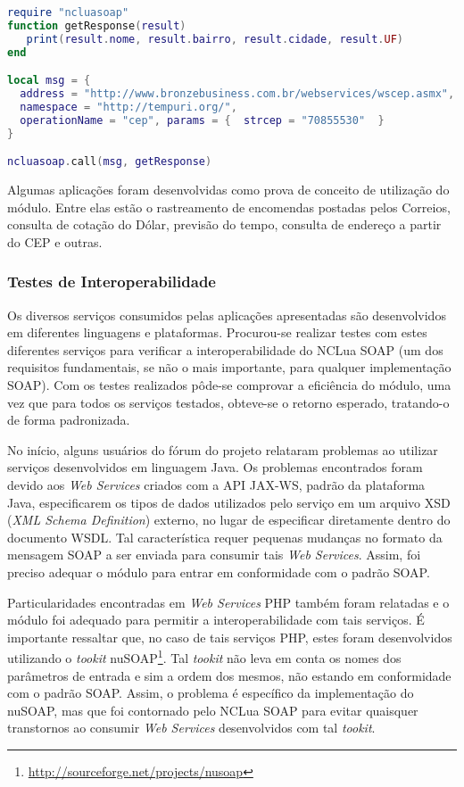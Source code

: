 \begin{lstlisting}[caption=Exemplo de consumo de WS de consulta de endereço a partir do CEP, label=list:ncluasoap2, language=lua]
require "ncluasoap"
function getResponse(result)
   print(result.nome, result.bairro, result.cidade, result.UF)
end

local msg = {
  address = "http://www.bronzebusiness.com.br/webservices/wscep.asmx",
  namespace = "http://tempuri.org/",
  operationName = "cep", params = {  strcep = "70855530"  }  
}

ncluasoap.call(msg, getResponse)
\end{lstlisting}

Algumas aplicações foram desenvolvidas como prova de conceito de utilização do módulo.
Entre elas estão o rastreamento de encomendas postadas pelos Correios,
consulta de cotação do Dólar, previsão do tempo,
consulta de endereço a partir do CEP e outras.

\subsubsection{Testes de Interoperabilidade}

Os diversos serviços consumidos pelas aplicações apresentadas 
são desenvolvidos em diferentes linguagens e plataformas. Procurou-se realizar testes
com estes diferentes serviços para verificar a interoperabilidade do NCLua SOAP 
(um dos requisitos fundamentais, se não o mais importante, para qualquer implementação
SOAP). Com os testes realizados pôde-se comprovar a eficiência do módulo, uma vez que para todos
os serviços testados, obteve-se o retorno esperado, tratando-o de forma padronizada.

No início, alguns usuários do fórum do projeto relataram problemas ao utilizar serviços
desenvolvidos em linguagem Java. Os problemas encontrados foram
devido aos \textit{Web Services} criados com a API JAX-WS, padrão da plataforma Java,
especificarem os tipos de dados utilizados pelo serviço em um arquivo XSD (\textit{XML Schema Definition}) externo,
no lugar de especificar diretamente dentro do documento WSDL. 
Tal característica requer pequenas mudanças no formato da mensagem SOAP
a ser enviada para consumir tais \textit{Web Services}. Assim, foi
preciso adequar o módulo para entrar em conformidade com o padrão SOAP.

Particularidades encontradas em \textit{Web Services} PHP também foram relatadas
e o módulo foi adequado para permitir a interoperabilidade com tais serviços.
É importante ressaltar que, no caso de tais serviços PHP, estes foram desenvolvidos
utilizando o \textit{tookit} nuSOAP\footnote{\url{http://sourceforge.net/projects/nusoap}}.
Tal \textit{tookit} não leva em conta os nomes dos parâmetros de entrada e sim a ordem
dos mesmos, não estando em conformidade com o padrão SOAP. Assim, o problema é específico da implementação
do nuSOAP, mas que foi contornado pelo NCLua SOAP para evitar quaisquer transtornos
ao consumir \textit{Web Services} desenvolvidos com tal \textit{tookit}. 

